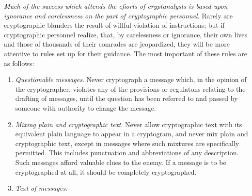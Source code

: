 \mypara \textit{Much of the success which attends the eﬁorts of cryptanalysts is
based upon ignorance and carelessness on the part of cryptographic personnel}. Rarely are cryptographic blunders the result of willful violation
of instructions; but if cryptographic personnel realize, that, by carelessness or ignorance, their own lives and those of thousands of their comrades are jeopardized, they will be more attentive to rules set up for their
guidance. The most important of these rules are as follows:
\begin{enumerate}
\item \textit{Questionable messages}. Never cryptograph a message which, in
the opinion of the cryptographer, violates any of the provisions
or regulatons relating to the drafting of messages, until the
question has been referred to and passed by someone with
authority to change the message.

\item \textit{Mixing plain and cryptographic text}. Never allow cryptographic
text with its equivalent plain language to appear in a cryptogram, and never mix plain and cryptographic text, except in
messages where such mixtures are speciﬁcally permitted. This
includes punctuation and abbreviations of any description. Such
messages afford valuable clues to the enemy. If a message is to
be cryptographed at all, it should be completely cryptographed.

\item \textit{Text of messages}.


\end{enumerate}
